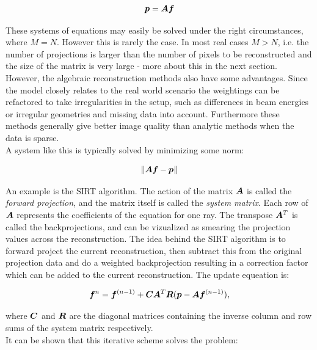 \begin{align}
\vec{p} = \mat{A}\vec{f}
\end{align}

These systems of equations may easily be solved under the right circumstances, where $M = N$. However this is rarely the case. In most real cases $M > N$, i.e. the number of projections is larger than the number of pixels to be reconstructed and the size of the matrix is very large - more about this in the next section.\\

However, the algebraic reconstruction methods also have some advantages. Since the model closely relates to the real world scenario the weightings can be refactored to take irregularities in the setup, such as differences in beam energies or irregular geometries and missing data into account. Furthermore these methods generally give better image quality than analytic methods when the data is sparse.\\

A system like this is typically solved by minimizing some norm:

\begin{align}
\norm{\mat{A}\vec{f}-\vec{p}}
\end{align}

An example is the SIRT algorithm. The action of the matrix $\mat{A}$ is called the \emph{forward projection}, and the matrix itself is called the \emph{system matrix}. Each row of $\mat{A}$ represents the coefficients of the equation for one ray. The transpose $\mat{A}^{T}$ is called the backprojections, and can be vizualized as smearing the projection values across the reconstruction. The idea behind the SIRT algorithm is to forward project the current reconstruction, then subtract this from the original projection data and do a weighted backprojection resulting in a correction factor which can be added to the current reconstruction. The update equeation is:

\begin{align}
\vec{f}^{n} = \vec{f}^{(n-1)}+\mat{C}\mat{A}^{T}\mat{R}(\vec{p}-\mat{A}\vec{f}^{(n-1)}),
\end{align}

where $\mat{C}$ and $\mat{R}$ are the diagonal matrices containing the inverse column and row sums of the system matrix respectively.\\

It can be shown that this iterative scheme solves the problem:

